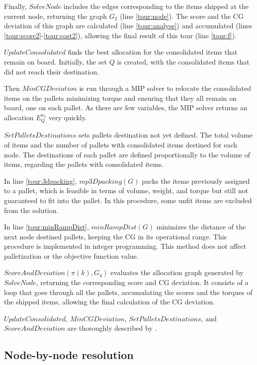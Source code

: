 \documentclass[preprint,authoryear]{elsarticle}
\begin{document}
Finally, $SolveNode$\/ includes the edges corresponding to the items shipped at the current node, returning the graph $G_2$\/ (line \ref{tour:node}). The score and the CG deviation of this graph are calculated (line \ref{tour:analyse}) and accumulated (lines \ref{tour:score2}-\ref{tour:cost2}), allowing the final result of this tour (line \ref{tour:f}).

$UpdateConsolidated$ finds the best allocation for the consolidated items that remain on board. Initially, the set $Q$ is created, with the consolidated items that did not reach their destination.

Then $MinCGDeviation$ is run through a MIP solver to relocate the consolidated items on the pallets minimizing torque and ensuring that they all remain on board, one on each pallet. As there are few variables, the MIP solver returns an allocation $E_Q^{\pi_k}$ very quickly.

$SetPalletsDestinations$ sets pallets destination not yet defined. The total volume of items and the number of pallets with consolidated items destined for each node. The destinations of each pallet are defined proportionally to the volume of items, regarding the pallets with consolidated items.

{\color{purple}
In line \ref{tour:3dpacking}, $mp3Dpacking(G)$ packs the items previously assigned to a pallet, which is feasible in terms of volume, weight, and torque but still not guaranteed to fit into the pallet. In this procedure, some unfit items are excluded from the solution.
}

{\color{blue}
In line \ref{tour:minRampDist}, $minRampDist(G)$ minimizes the distance of the next node destined pallets, keeping the CG in its operational range. This procedure is implemented in integer programming. This method does not affect palletization or the objective function value.
}

$ScoreAndDeviation(\pi(k), G_4)$ evaluates the allocation graph generated by $SolveNode$, returning the corresponding score and CG deviation. It consists of a loop that goes through all the pallets, accumulating the scores and the torques of the shipped items, allowing the final calculation of the CG deviation.

$UpdateConsolidated$, $MinCGDeviation$, $SetPalletsDestinations$, and $ScoreAndDeviation$ are thoroughly described by \cite{MesquitaSanches2023}.


\subsection{Node-by-node resolution}
\label{methods}
\end{document}
